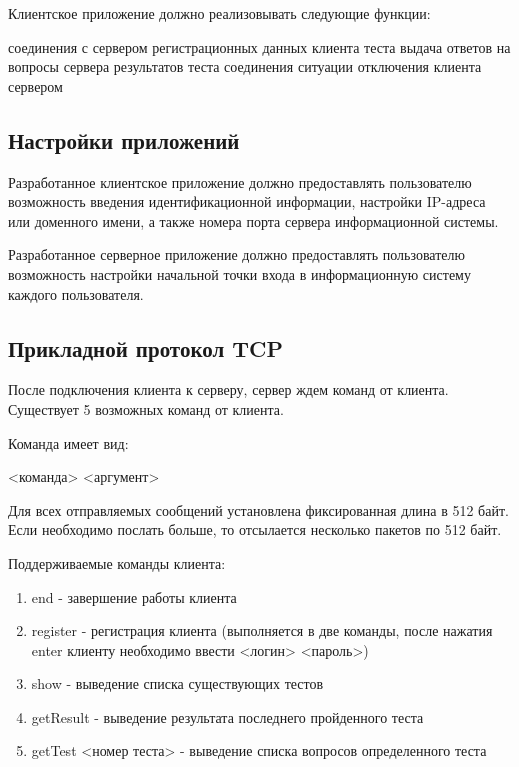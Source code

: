 \vspace{5mm}
Клиентское приложение должно реализовывать следующие функции:
\vspace{5mm}

\begin{enumerate}
 соединения с сервером
 регистрационных данных клиента
 теста
 выдача ответов на вопросы сервера
 результатов теста
 соединения
 ситуации отключения клиента сервером
\end{enumerate}

\vspace{5mm}

\subsection{Настройки приложений}

\vspace{5mm}

Разработанное клиентское приложение должно предоставлять пользователю возможность введения идентификационной информации, настройки IP-адреса или доменного имени, а также номера порта сервера информационной системы.

\vspace{5mm}

Разработанное серверное приложение должно предоставлять пользователю возможность настройки начальной точки входа в информационную систему каждого пользователя.

\subsection{Прикладной протокол TCP}

После подключения клиента к серверу, сервер ждем команд от клиента. Существует 5 возможных команд от клиента. 

Команда имеет вид:

<команда> <аргумент>

\vspace{3mm}

Для всех отправляемых сообщений установлена фиксированная длина в 512 байт. Если необходимо послать больше, то отсылается несколько пакетов по 512 байт. 

Поддерживаемые команды клиента:

\begin{enumerate}
\item end - завершение работы клиента
\item register - регистрация клиента (выполняется в две команды, после нажатия enter клиенту необходимо ввести <логин> <пароль>)
\item show - выведение списка существующих тестов
\item getResult - выведение результата последнего пройденного теста
\item getTest <номер теста> - выведение списка вопросов определенного теста
\end{enumerate}

